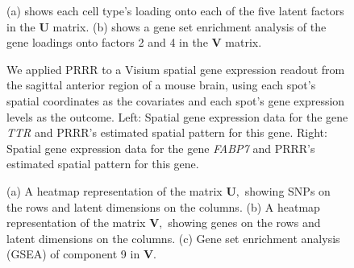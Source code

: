 \documentclass{bmcart}
\begin{document}
\begin{backmatter}
\begin{figure}%
\centering
\caption{ (a) shows each cell type's loading onto each of the five latent factors in the $\mathbf{U}$ matrix. (b) shows a gene set enrichment analysis of the gene loadings onto factors 2 and 4 in the $\mathbf{V}$ matrix.}
\label{fig:pancreas_factor_loadings_figure}
\end{figure}

\begin{figure}%
\centering
\caption{ We applied PRRR to a Visium spatial gene expression readout from the sagittal anterior region of a mouse brain, using each spot's spatial coordinates as the covariates and each spot's gene expression levels as the outcome. Left: Spatial gene expression data for the gene \emph{TTR} and PRRR's estimated spatial pattern for this gene. Right: Spatial gene expression data for the gene \emph{FABP7} and PRRR's estimated spatial pattern for this gene.
}
\label{fig:spatial}
\end{figure}

\begin{figure}%
\centering
\caption{ (a) A heatmap representation of the matrix $\mathbf{U},$ showing SNPs on the rows and latent dimensions on the columns. (b) A heatmap representation of the matrix $\mathbf{V},$ showing genes on the rows and latent dimensions on the columns. (c) Gene set enrichment analysis (GSEA) of component 9 in $\mathbf{V}$.
}
\label{fig:heatmap_fig}
\end{figure}

\begin{figure}%
\centering
\caption{
}
\label{fig:gtex_eqtl_boxplots}
\end{figure}




\end{backmatter}
\end{document}
